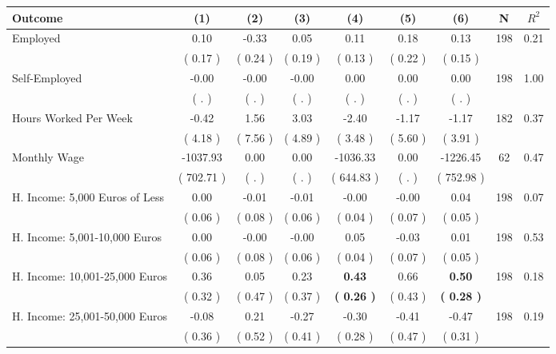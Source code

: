 \begin{tabular}{lcccccccc}
\toprule
 \textbf{Outcome} & \textbf{(1)} & \textbf{(2)} & \textbf{(3)} & \textbf{(4)} & \textbf{(5)} & \textbf{(6)} & \textbf{N} & \textbf{$ R^2$} \\
\midrule
Employed &      0.10 &     -0.33 &      0.05 &      0.11 &      0.18 &      0.13 & 198 &       0.21 \\ 
 & (     0.17 ) & (     0.24 ) & (     0.19 ) & (     0.13 ) & (     0.22 ) & (     0.15 ) & \\
Self-Employed &     -0.00 &     -0.00 &     -0.00 &      0.00 &      0.00 &      0.00 & 198 &       1.00 \\ 
 & (        . ) & (        . ) & (        . ) & (        . ) & (        . ) & (        . ) & \\
Hours Worked Per Week &     -0.42 &      1.56 &      3.03 &     -2.40 &     -1.17 &     -1.17 & 182 &       0.37 \\ 
 & (     4.18 ) & (     7.56 ) & (     4.89 ) & (     3.48 ) & (     5.60 ) & (     3.91 ) & \\
Monthly Wage &  -1037.93 &      0.00 &      0.00 &  -1036.33 &      0.00 &  -1226.45 & 62 &       0.47 \\ 
 & (   702.71 ) & (        . ) & (        . ) & (   644.83 ) & (        . ) & (   752.98 ) & \\
H. Income: 5,000 Euros of Less &      0.00 &     -0.01 &     -0.01 &     -0.00 &     -0.00 &      0.04 & 198 &       0.07 \\ 
 & (     0.06 ) & (     0.08 ) & (     0.06 ) & (     0.04 ) & (     0.07 ) & (     0.05 ) & \\
H. Income: 5,001-10,000 Euros &      0.00 &     -0.00 &     -0.00 &      0.05 &     -0.03 &      0.01 & 198 &       0.53 \\ 
 & (     0.06 ) & (     0.08 ) & (     0.06 ) & (     0.04 ) & (     0.07 ) & (     0.05 ) & \\
H. Income: 10,001-25,000 Euros &      0.36 &      0.05 &      0.23 & \textbf{     0.43} &      0.66 & \textbf{     0.50} & 198 &       0.18 \\ 
 & (     0.32 ) & (     0.47 ) & (     0.37 ) & \textbf{(     0.26 )} & (     0.43 ) & \textbf{(     0.28 )} & \\
H. Income: 25,001-50,000 Euros &     -0.08 &      0.21 &     -0.27 &     -0.30 &     -0.41 &     -0.47 & 198 &       0.19 \\ 
 & (     0.36 ) & (     0.52 ) & (     0.41 ) & (     0.28 ) & (     0.47 ) & (     0.31 ) & \\

\end{tabular}

